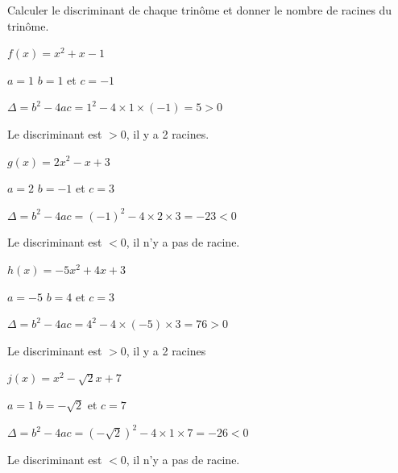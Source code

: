 \documentclass[11pt,a4paper]{article}  %
\begin{document}
Calculer le discriminant de chaque trinôme et donner le nombre de racines du trinôme.
\begin{enumMet}
	\item $f(x)=x^2+x-1$
	\begin{corrBox}
		$a=1$ $b=1$ et $c=-1$
		
		$\Delta=b^2-4ac=1^2-4\times 1\times (-1)=5>0$
		
		Le discriminant est $>0$, il y a 2 racines.		
	\end{corrBox}
	\item $g(x)=2 x^2-x+3$
	\begin{corrBox}
		$a=2$ $b=-1$ et $c=3$
		
		$\Delta=b^2-4ac=(-1)^2-4\times 2\times 3=-23<0$
		
		Le discriminant est $<0$, il n'y a pas de racine.		
	\end{corrBox}
	\item $h(x)=-5 x^2+4 x+3$
	\begin{corrBox}
		$a=-5$ $b=4$ et $c=3$
		
		$\Delta=b^2-4ac=4^2-4\times (-5)\times 3=76>0$
		
		Le discriminant est $>0$, il y a 2 racines		
	\end{corrBox}
	\item $j(x)=x^2-\sqrt{2} x+7$
	\begin{corrBox}
		$a=1$ $b=-\sqrt{2}$ et $c=7$
		
		$\Delta=b^2-4ac=(-\sqrt{2})^2-4\times 1\times 7=-26<0$
		
		Le discriminant est $<0$, il n'y a pas de racine.
	\end{corrBox}
\end{enumMet}
\end{document}
